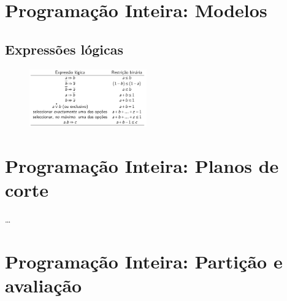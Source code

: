 \documentclass[10pt, a4paper]{article}
\begin{document}
\begin{multicols}{2}
\section{Programação Inteira: Modelos}

\subsection{Expressões lógicas}

\begin{figure}[H]
    \centering
    \includegraphics[width=0.45\textwidth]{expr_logicas.png}
\end{figure}


\section{Programação Inteira: Planos de corte}

\dots

\section{Programação Inteira: Partição e avaliação}



\end{multicols}
\end{document}
